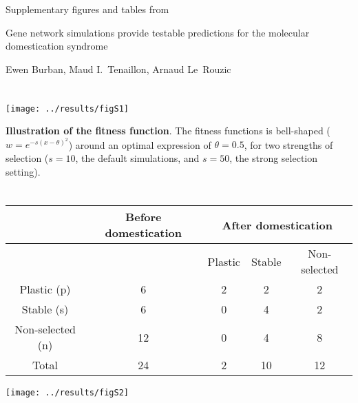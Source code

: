 \documentclass[10pt,a4paper]{article}
\begin{document}
\begin{center}
\vspace{2cm}


{\Huge\textsc Supplementary figures and tables from}

\vspace{1cm}

{\LARGE Gene network simulations provide testable predictions for the molecular domestication syndrome}

\vspace{1cm}

{\LARGE Ewen Burban, Maud I.\ Tenaillon, Arnaud Le~Rouzic}

\end{center}

\vspace{3cm}

\section{}

\begin{center}
\texttt{[image: ../results/figS1]}
\end{center}

\textbf{Illustration of the fitness function}. The fitness functions is bell-shaped ($w = e^{-s(x-\theta)^2}$) around an optimal expression of $\theta=0.5$, for two strengths of selection ($s=10$, the default simulations, and $s=50$, the strong selection setting).  

\clearpage

\section{}

\vspace{2cm}

\begin{center}
\begin{tabular}{ccccc}
 & Before domestication & \multicolumn{3}{c}{After domestication} \\ \hline
 & & Plastic & Stable & Non-selected \\ \hline
 Plastic (p) & 6 & 2 & 2 & 2 \\
 Stable (s)  & 6 & 0 & 4 & 2 \\
 Non-selected (n) & 12 & 0 & 4 & 8 \\ \hline
 Total            & 24 & 2 & 10 & 12 
\end{tabular}

\vspace{2cm}

\texttt{[image: ../results/figS2]}
\end{center}
\end{document}
